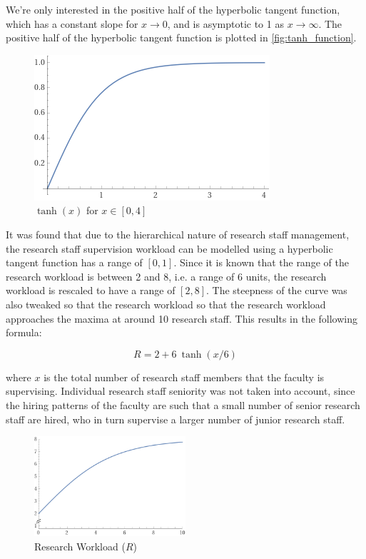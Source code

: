 We're only interested in the positive half of the hyperbolic tangent function, which has a constant slope for $x \to 0$, and is asymptotic to 1 as $x \to \infty$. The positive half of the hyperbolic tangent function is plotted in \autoref{fig:tanh_function}.

\begin{figure}[htpb]
  \centering
  \includegraphics[width=0.5\linewidth]{images/tanh_plot.png}
  \caption{\(\tanh(x)\) for \(x \in [0, 4]\)}
  \label{fig:tanh_function}
\end{figure}


It was found that due to the hierarchical nature of research staff management, the research staff supervision workload can be modelled using a hyperbolic tangent function has a range of $[0, 1]$. Since it is known that the range of the research workload is between 2 and 8, i.e. a range of 6 units, the research workload is rescaled to have a range of $[2, 8]$. The steepness of the curve was also tweaked so that the research workload so that the research workload approaches the maxima at around 10 research staff. This results in the following formula:

\begin{equation}
  R  = 2 + 6\ \tanh(x/6)
\end{equation}

where $x$ is the total number of research staff members that the faculty is supervising. Individual research staff seniority was not taken into account, since the hiring patterns of the faculty are such that a small number of senior research staff are hired, who in turn supervise a larger number of junior research staff.

\begin{figure}[H]
  \includegraphics[width=0.5\textwidth]{images/rts_research_plot.png}
  \centering
  \caption{Research Workload ($R$)}
  \label{fig:rts_research_plot}
\end{figure}

